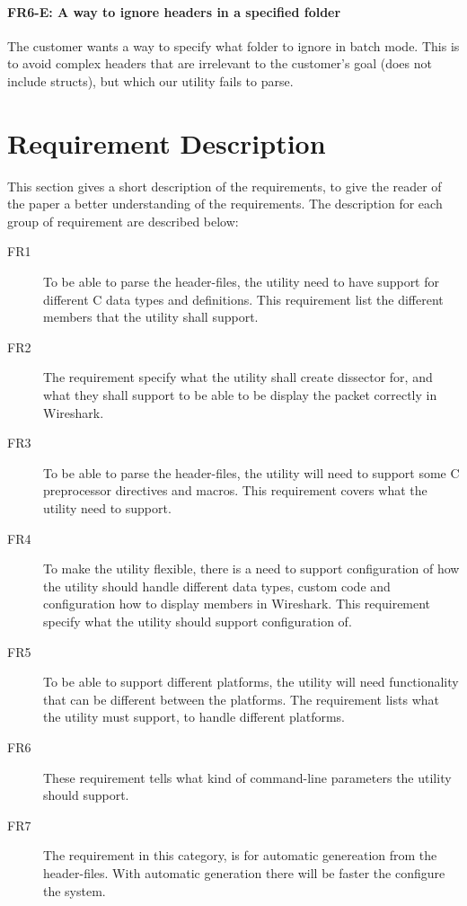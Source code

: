 \paragraph{FR6-E: A way to ignore headers in a specified folder}
The customer wants a way to specify what folder to ignore in batch mode.
This is to avoid complex headers that are irrelevant to the customer's goal
(does not include structs), but which our utility fails to parse.


\section{Requirement Description}
\label{sec:req:desc}
This section gives a short description of the requirements, to give the reader 
of the paper a better understanding of the requirements. The description for 
each group of requirement are described below:

\begin{description}
	\item[FR1] To be able to parse the header-files, the utility need to have
		 support for different C data types and definitions. This requirement list 
		the different members that the utility shall support.
	\item[FR2] The requirement specify what the utility shall create dissector 
		for, and what they shall support to be able to be display the packet 
		correctly in Wireshark. 
	\item[FR3] To be able to parse the header-files, the utility will need to 
		support some C preprocessor directives and macros. This requirement covers 
		what the utility need to support.
	\item[FR4] To make the utility flexible, there is a need to support 
		configuration of how the utility should handle different data types, custom 
		code and configuration how to display members in Wireshark. This requirement 
		specify what the utility should support configuration of.
	\item[FR5] To be able to support different platforms, the utility will need 
		functionality that can be different between the platforms. The requirement 
		lists what the utility must support, to handle different platforms.
	\item[FR6] These requirement tells what kind of command-line parameters the 
		utility should support. 
	\item[FR7] The requirement in this category, is for automatic genereation 
		from the header-files. With automatic generation there will be faster the 
		configure the system.
\end{description}

